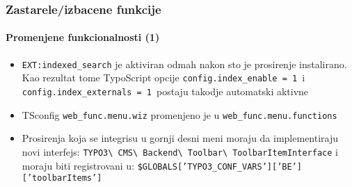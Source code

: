 \begin{frame}[fragile]
	\frametitle{Zastarele/izbacene funkcije}
	\framesubtitle{Promenjene funkcionalnosti (1)}

	\begin{itemize}

		\item \texttt{EXT:indexed\_search} je aktiviran odmah nakon sto je prosirenje instalirano.
			Kao rezultat tome TypoScript opcije \small\texttt{config.index\_enable = 1 }\normalsize i \small\texttt{config.index\_externals = 1 }\normalsize postaju takodje automatski aktivne

		\item TSconfig \small\texttt{web\_func.menu.wiz}\normalsize\space
			promenjeno je u \small\texttt{web\_func.menu.functions}\normalsize

		\item Prosirenja koja se integrisu u gornji desni meni moraju da implementiraju novi interfejs:
			\small
				\texttt{TYPO3\textbackslash
					CMS\textbackslash
					Backend\textbackslash
					Toolbar\textbackslash
					ToolbarItemInterface}
			\normalsize\newline
			i moraju biti registrovani u:
			\small
				\texttt{\$GLOBALS['TYPO3\_CONF\_VARS']['BE']['toolbarItems']}
			\normalsize

	\end{itemize}

\end{frame}


